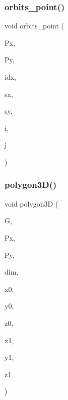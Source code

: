 \subsubsection{\texorpdfstring{orbits\+\_\+point()}{orbits\_point()}}
{\footnotesize\ttfamily void orbits\+\_\+point (\begin{DoxyParamCaption}\item[{\mbox{\hyperlink{galois_8h_a09fddde158a3a20bd2dcadb609de11dc}{I\+NT}} $\ast$}]{Px,  }\item[{\mbox{\hyperlink{galois_8h_a09fddde158a3a20bd2dcadb609de11dc}{I\+NT}} $\ast$}]{Py,  }\item[{\mbox{\hyperlink{galois_8h_a09fddde158a3a20bd2dcadb609de11dc}{I\+NT}}}]{idx,  }\item[{\mbox{\hyperlink{galois_8h_a09fddde158a3a20bd2dcadb609de11dc}{I\+NT}}}]{sx,  }\item[{\mbox{\hyperlink{galois_8h_a09fddde158a3a20bd2dcadb609de11dc}{I\+NT}}}]{sy,  }\item[{\mbox{\hyperlink{galois_8h_a09fddde158a3a20bd2dcadb609de11dc}{I\+NT}}}]{i,  }\item[{\mbox{\hyperlink{galois_8h_a09fddde158a3a20bd2dcadb609de11dc}{I\+NT}}}]{j }\end{DoxyParamCaption})}

\mbox{\label{draw_8_c_a815cdba801f65bcbd9f2097a501d464e}} 
\subsubsection{\texorpdfstring{polygon3\+D()}{polygon3D()}}
{\footnotesize\ttfamily void polygon3D (\begin{DoxyParamCaption}\item[{\mbox{\hyperlink{classmp__graphics}{mp\+\_\+graphics}} \&}]{G,  }\item[{\mbox{\hyperlink{galois_8h_a09fddde158a3a20bd2dcadb609de11dc}{I\+NT}} $\ast$}]{Px,  }\item[{\mbox{\hyperlink{galois_8h_a09fddde158a3a20bd2dcadb609de11dc}{I\+NT}} $\ast$}]{Py,  }\item[{\mbox{\hyperlink{galois_8h_a09fddde158a3a20bd2dcadb609de11dc}{I\+NT}}}]{dim,  }\item[{\mbox{\hyperlink{galois_8h_a09fddde158a3a20bd2dcadb609de11dc}{I\+NT}}}]{x0,  }\item[{\mbox{\hyperlink{galois_8h_a09fddde158a3a20bd2dcadb609de11dc}{I\+NT}}}]{y0,  }\item[{\mbox{\hyperlink{galois_8h_a09fddde158a3a20bd2dcadb609de11dc}{I\+NT}}}]{z0,  }\item[{\mbox{\hyperlink{galois_8h_a09fddde158a3a20bd2dcadb609de11dc}{I\+NT}}}]{x1,  }\item[{\mbox{\hyperlink{galois_8h_a09fddde158a3a20bd2dcadb609de11dc}{I\+NT}}}]{y1,  }\item[{\mbox{\hyperlink{galois_8h_a09fddde158a3a20bd2dcadb609de11dc}{I\+NT}}}]{z1 }\end{DoxyParamCaption})}

